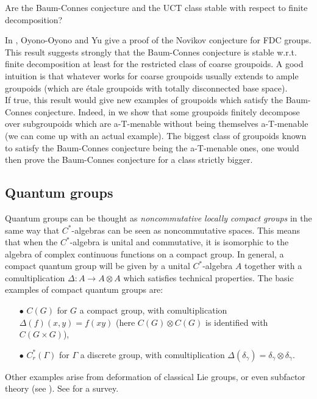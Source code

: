 \begin{project} Are the Baum-Connes conjecture and the UCT class stable with respect to finite decomposition?
\end{project}

In \cite{OY4}, Oyono-Oyono and Yu give a proof of the Novikov conjecture for FDC groups. This result suggests strongly that the Baum-Connes conjecture is stable w.r.t. finite decomposition at least for the restricted class of coarse groupoids. A good intuition is that whatever works for coarse groupoids usually extends to ample groupoids (which are \'etale groupoids with totally disconnected base space). \\

If true, this result would give new examples of groupoids which satisfy the Baum-Connes conjecture. Indeed, in \cite{DelBo18} we show that some groupoids finitely decompose over subgroupoids which are a-T-menable without being themselves a-T-menable (we can come up with an actual example). The biggest class of groupoids known to satisfy the Baum-Connes conjecture being the a-T-menable ones, one would then prove the Baum-Connes conjecture for a class strictly bigger.

\subsection{Quantum groups}

Quantum groups can be thought as \textit{noncommutative locally compact groups} in the same way that $C^*$-algebras can be seen as noncommutative spaces. This means that when the $C^*$-algebra is unital and commutative, it is isomorphic to the algebra of complex continuous functions on a compact group. In general, a compact quantum group will be given by a unital $C^*$-algebra $A$ together with a comultiplication $\Delta : A \rightarrow A \otimes A$ which satisfies technical properties. The basic examples of compact quantum groups are:
\begin{itemize}
\item[$\bullet$] $C(G)$ for $G$ a compact group, with comultiplication $\Delta(f)(x,y)= f(xy)$ (here $C(G)\otimes C(G)$ is identified with $C(G\times G)$),
\item[$\bullet$] $C^*_r(\Gamma)$ for $\Gamma$ a discrete group, with comultiplication $\Delta(\delta_\gamma)= \delta_\gamma \otimes \delta_\gamma$.
\end{itemize}     
Other examples arise from deformation of classical Lie groups, or even subfactor theory (see \cite{vaesT}). See \cite{Wo} for a survey.\\

